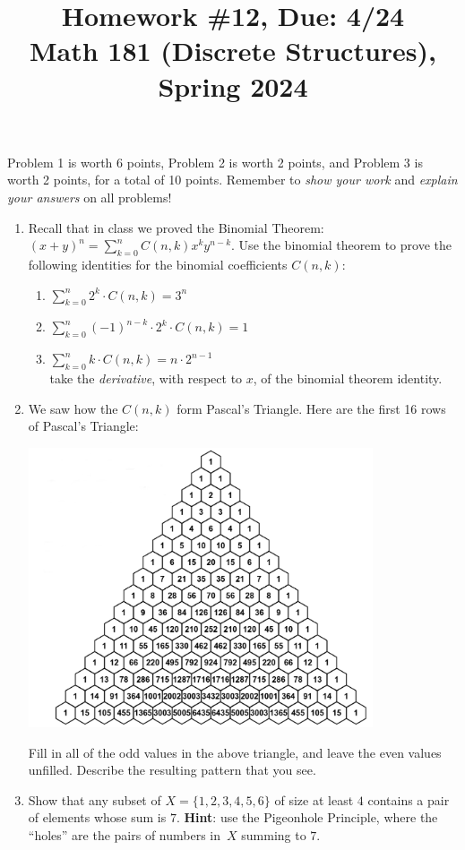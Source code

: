 \documentclass[11pt]{article}
\title{Homework \#12, Due: 4/24 \\Math 181 (Discrete Structures), Spring 2024}
\date{}
\begin{document}
\maketitle

\thispagestyle{empty}

\vspace{-1cm}

Problem 1 is worth 6 points, Problem 2 is worth 2 points, and Problem 3 is worth 2 points, for a total of 10 points. Remember to \emph{show your work} and \emph{explain your answers} on all problems!

\begin{enumerate}

\item Recall that in class we proved the Binomial Theorem: $(x+y)^n = \sum_{k=0}^{n} C(n,k) x^{k} y^{n-k}$. Use the binomial theorem to prove the following identities for the binomial coefficients $C(n,k)$:
\begin{enumerate}
\item $\sum_{k=0}^{n} 2^k \cdot C(n,k) = 3^n$
\item $\sum_{k=0}^{n} (-1)^{n-k} \cdot 2^k \cdot C(n,k) = 1$
\item $\sum_{k=0}^{n} k \cdot C(n,k) = n \cdot 2^{n-1}$ \\[5pt]  take the \emph{derivative}, with respect to $x$, of the binomial theorem identity.
\end{enumerate}

\item We saw how the $C(n,k)$ form Pascal's Triangle. Here are the first 16 rows of Pascal's Triangle:
\begin{center}
\includegraphics[width=4in]{pascal.png}
\end{center}
Fill in all of the odd values in the above triangle, and leave the even values unfilled. Describe the resulting pattern that you see.

\item Show that any subset of $X = \{1,2,3,4,5,6\}$ of size at least $4$ contains a pair of elements whose sum is $7$. {\bf Hint}: use the Pigeonhole Principle, where the ``holes'' are the pairs of numbers in~$X$ summing to $7$.

\end{enumerate}
\end{document}
